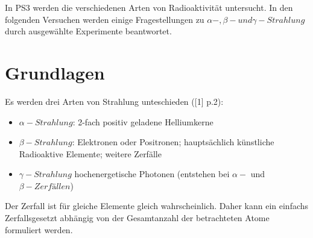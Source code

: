 \documentclass[12pt,a4paper]{article}
\begin{document}
\begin{multicols}{2}




%			




\noindent In PS3 werden die verschiedenen Arten von Radioaktivität untersucht. In den folgenden Versuchen werden einige Fragestellungen zu $\alpha-, \beta- und \gamma-Strahlung$ durch ausgewählte Experimente beantwortet.

\section{Grundlagen}
Es werden drei Arten von Strahlung unteschieden ([1] p.2):
\begin{itemize}
	\item $\alpha-Strahlung$: 2-fach positiv geladene Helliumkerne
	\item $\beta-Strahlung$: Elektronen oder Positronen; hauptsächlich künstliche Radioaktive Elemente; weitere Zerfälle
	\item $\gamma-Strahlung$ hochenergetische Photonen (entstehen bei $\alpha-$ und $\beta-Zerfällen$)
\end{itemize}
Der Zerfall ist für gleiche Elemente gleich wahrscheinlich. 
Daher kann ein einfachs Zerfallsgesetzt abhängig von der Gesamtanzahl der betrachteten Atome formuliert werden.

\end{multicols}
\end{document}
